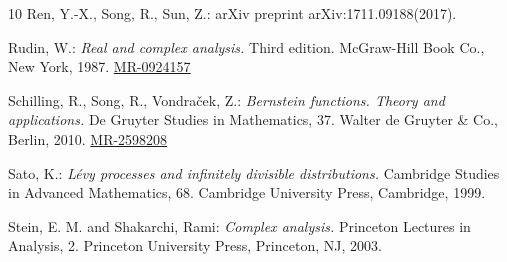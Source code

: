 \documentclass[12pt,oneside,english]{amsart}
\def\MR#1{\href{http://www.ams.org/mathscinet-getitem?mr=#1}{MR-#1}}
\theoremstyle{plain}
\theoremstyle{definition}
\numberwithin{equation}{section}
\begin{document}
\begin{thebibliography} {10}
Ren, Y.-X., Song, R., Sun, Z.:
 arXiv preprint arXiv:1711.09188(2017).

Rudin, W.:
\emph{Real and complex analysis.}
Third edition. McGraw-Hill Book Co., New York, 1987.
\MR{0924157}

Schilling, R., Song, R., Vondra\v{c}ek, Z.:
\emph{Bernstein functions. Theory and applications.}
De Gruyter Studies in Mathematics, 37. Walter de Gruyter \& Co., Berlin, 2010.
\MR{2598208}


Sato, K.:
\emph{Lévy processes and infinitely divisible distributions.}
Cambridge Studies in Advanced Mathematics, 68. Cambridge University Press, Cambridge, 1999.

Stein, E. M. and Shakarchi, Rami:
\emph{Complex analysis.} 
Princeton Lectures in Analysis, 2. Princeton University Press, Princeton, NJ, 2003.

\end{thebibliography}
\end{document}
